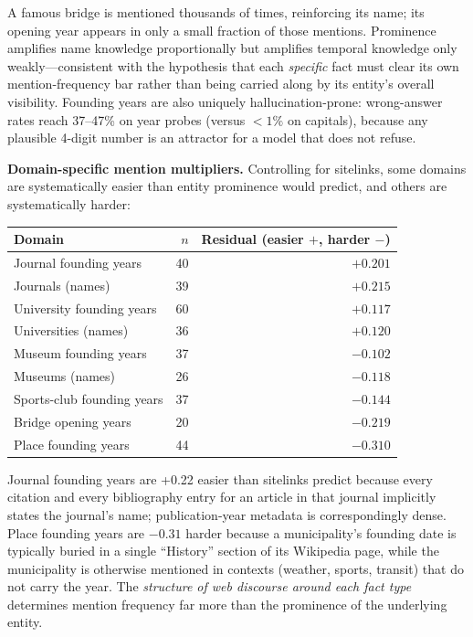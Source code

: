 \documentclass[11pt]{article}
\begin{document}
A famous bridge is mentioned thousands of times, reinforcing its name; its opening year appears in only a small fraction of those mentions. Prominence amplifies name knowledge proportionally but amplifies temporal knowledge only weakly---consistent with the hypothesis that each \emph{specific} fact must clear its own mention-frequency bar rather than being carried along by its entity's overall visibility. Founding years are also uniquely hallucination-prone: wrong-answer rates reach 37--47\% on year probes (versus ${<}1\%$ on capitals), because any plausible 4-digit number is an attractor for a model that does not refuse.

\textbf{Domain-specific mention multipliers.} Controlling for sitelinks, some domains are systematically easier than entity prominence would predict, and others are systematically harder:

\begin{center}
\begin{tabular}{lrr}
\toprule
Domain & $n$ & Residual (easier $+$, harder $-$) \\
\midrule
Journal founding years        & 40 & $+0.201$ \\
Journals (names)              & 39 & $+0.215$ \\
University founding years     & 60 & $+0.117$ \\
Universities (names)          & 36 & $+0.120$ \\
Museum founding years         & 37 & $-0.102$ \\
Museums (names)               & 26 & $-0.118$ \\
Sports-club founding years    & 37 & $-0.144$ \\
Bridge opening years          & 20 & $-0.219$ \\
Place founding years          & 44 & $-0.310$ \\
\bottomrule
\end{tabular}
\end{center}

Journal founding years are +0.22 easier than sitelinks predict because every citation and every bibliography entry for an article in that journal implicitly states the journal's name; publication-year metadata is correspondingly dense. Place founding years are $-0.31$ harder because a municipality's founding date is typically buried in a single ``History'' section of its Wikipedia page, while the municipality is otherwise mentioned in contexts (weather, sports, transit) that do not carry the year. The \emph{structure of web discourse around each fact type} determines mention frequency far more than the prominence of the underlying entity.
\end{document}
